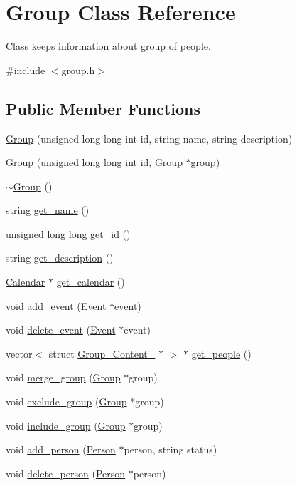 \hypertarget{classGroup}{
\section{Group Class Reference}
\label{d0/db7/classGroup}
}


Class keeps information about group of people.  




{\ttfamily \#include $<$group.h$>$}

\subsection*{Public Member Functions}
\begin{DoxyCompactItemize}
\item 
\hyperlink{classGroup_af95a25f62c49e6aa1e71ef064abc2be4}{Group} (unsigned long long int id, string name, string description)
\item 
\hyperlink{classGroup_a38e2e1f390099856773826609f4e58a1}{Group} (unsigned long long int id, \hyperlink{classGroup}{Group} $\ast$group)
\item 
\hyperlink{classGroup_aed00a22ff227ee2657ae44a5cbcedf7c}{$\sim$Group} ()
\item 
string \hyperlink{classGroup_aab2e4ec29eda3a490dede01eb9411f03}{get\_\-name} ()
\item 
unsigned long long \hyperlink{classGroup_a792a8759e72b90a54f079370d71bdbdb}{get\_\-id} ()
\item 
string \hyperlink{classGroup_ade4eb90fbeb5f50dfb2ccb262cd39ce8}{get\_\-description} ()
\item 
\hyperlink{classCalendar}{Calendar} $\ast$ \hyperlink{classGroup_a10f85a428de5c1215fd7d319bd1a9ca3}{get\_\-calendar} ()
\item 
void \hyperlink{classGroup_a8888e1a6507d004f3b5317fc9a65f005}{add\_\-event} (\hyperlink{classEvent}{Event} $\ast$event)
\item 
void \hyperlink{classGroup_a70b5f6f47818f5d4912926b29faa96bf}{delete\_\-event} (\hyperlink{classEvent}{Event} $\ast$event)
\item 
vector$<$ struct \hyperlink{structGroup__Content__}{Group\_\-Content\_\-} $\ast$ $>$ $\ast$ \hyperlink{classGroup_a8578c69459be6971dd31e76357f934dc}{get\_\-people} ()
\item 
void \hyperlink{classGroup_a2aca17525330aeaf591e0bc243a8149e}{merge\_\-group} (\hyperlink{classGroup}{Group} $\ast$group)
\item 
void \hyperlink{classGroup_a7fccd60929bd2e36db09fe37fffe0548}{exclude\_\-group} (\hyperlink{classGroup}{Group} $\ast$group)
\item 
void \hyperlink{classGroup_ac753fa2674ec19ab156645f978654961}{include\_\-group} (\hyperlink{classGroup}{Group} $\ast$group)
\item 
void \hyperlink{classGroup_afc2080f42e091f6831fd9d80e7b8f0d9}{add\_\-person} (\hyperlink{classPerson}{Person} $\ast$person, string status)
\item 
void \hyperlink{classGroup_ad00847c4219c29fd3b94c6784870b629}{delete\_\-person} (\hyperlink{classPerson}{Person} $\ast$person)
\end{DoxyCompactItemize}


